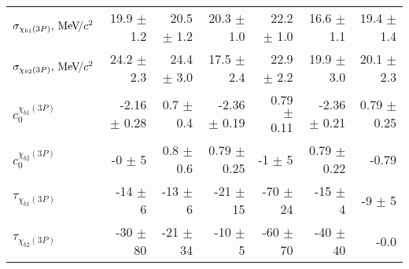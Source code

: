 \begin{table}[H]
{{\begin{tabular}{lrrrrrr}
\rule{0pt}{4ex}$\sigma_{\chi_{b1}(3P)}, {\mathrm{\,Me\kern -0.1em V\!/}c^2}$ & 19.9 $\pm$ 1.2 & 20.5 $\pm$ 1.2 & 20.3 $\pm$ 1.0 & 22.2 $\pm$ 1.0 & 16.6 $\pm$ 1.1 & 19.4 $\pm$ 1.4\\
$\sigma_{\chi_{b2}(3P)}, {\mathrm{\,Me\kern -0.1em V\!/}c^2}$ & 24.2 $\pm$ 2.3 & 24.4 $\pm$ 3.0 & 17.5 $\pm$ 2.4 & 22.9 $\pm$ 2.2 & 19.9 $\pm$ 3.0 & 20.1 $\pm$ 2.3\\

\rule{0pt}{4ex}$c_0^{\chi_{b1}(3P)}$ & -2.16 $\pm$ 0.28 & 0.7 $\pm$ 0.4 & -2.36 $\pm$ 0.19 & 0.79 $\pm$ 0.11 & -2.36 $\pm$ 0.21 & 0.79 $\pm$ 0.25\\
$c_0^{\chi_{b2}(3P)}$ & -0 $\pm$ 5 & 0.8 $\pm$ 0.6 & 0.79 $\pm$ 0.25 & -1 $\pm$ 5 & 0.79 $\pm$ 0.22 & -0.79\\

\rule{0pt}{4ex}$\tau_{\chi_{b1}(3P)}$ & -14 $\pm$ 6 & -13 $\pm$ 6 & -21 $\pm$ 15 & -70 $\pm$ 24 & -15 $\pm$ 4 & -9 $\pm$ 5\\
$\tau_{\chi_{b2}(3P)}$ & -30 $\pm$ 80 & -21 $\pm$ 34 & -10 $\pm$ 5 & -60 $\pm$ 70 & -40 $\pm$ 40 & -0.0\\
\bottomrule
\end{tabular}
} %

} %
\label{tab:mc:chib3p_ups2s:fits}
\end{table}

